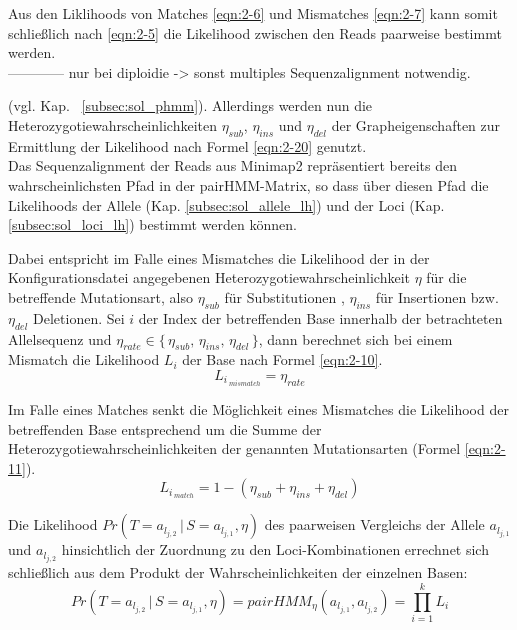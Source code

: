 Aus den Liklihoods von Matches \eqref{eqn:2-6} und Mismatches \eqref{eqn:2-7} kann somit schließlich nach \eqref{eqn:2-5} die Likelihood zwischen den Reads paarweise bestimmt werden.\\

------------
nur bei diploidie -> sonst multiples Sequenzalignment notwendig.

(vgl. Kap. ~\ref{subsec:sol_phmm}). Allerdings werden nun die Heterozygotiewahrscheinlichkeiten $\eta_{sub}$, $\eta_{ins}$ und $\eta_{del}$ der Grapheigenschaften zur Ermittlung der Likelihood nach Formel \eqref{eqn:2-20} genutzt.  \\

Das Sequenzalignment der Reads aus Minimap2 repräsentiert bereits den wahrscheinlichsten Pfad in der pairHMM-Matrix, so dass über diesen Pfad die Likelihoods der Allele (Kap. \ref{subsec:sol_allele_lh}) und der Loci (Kap. \ref{subsec:sol_loci_lh}) bestimmt werden können.

Dabei entspricht im Falle eines Mismatches die Likelihood der in der Konfigurationsdatei angegebenen Heterozygotiewahrscheinlichkeit $ \eta $ für die betreffende Mutationsart, also $ \eta_{sub} $ für Substitutionen , $ \eta_{ins} $ für Insertionen bzw. $ \eta_{del} $ Deletionen. Sei $i$ der Index der betreffenden Base innerhalb der betrachteten Allelsequenz und $ \eta_{rate} \in \{\,\eta_{sub},\, \eta_{ins},\, \eta_{del}\,\}$, dann berechnet sich bei einem Mismatch die Likelihood $L_{i}$ der Base nach Formel \eqref{eqn:2-10}.
\begin{equation} \label{eqn:2-10}
\tag{2-10}
L_{i\,_{mismatch}} = \eta_{rate}
\end{equation}

Im Falle eines Matches senkt die Möglichkeit eines Mismatches die Likelihood der betreffenden Base entsprechend um die Summe der Heterozygotiewahrscheinlichkeiten der genannten Mutationsarten (Formel \eqref{eqn:2-11}).
\begin{equation} \label{eqn:2-11}
\tag{2-11}
L_{i\,_{match}} = 1 - (\eta_{sub} + \eta_{ins} + \eta_{del})
\end{equation}

Die Likelihood $ Pr(T=a_{l_{j,2}} \, | \, S=a_{l_{j,1}}, \eta) $ des paarweisen Vergleichs der Allele $a_{l_{j,1}}$ und $a_{l_{j,2}}$ hinsichtlich der Zuordnung zu den Loci-Kombinationen errechnet sich schließlich aus dem Produkt der Wahrscheinlichkeiten der einzelnen Basen:
\begin{equation} \label{eqn:2-12}
\tag{2-12}
Pr(T=a_{l_{j,2}} \, | \, S=a_{l_{j,1}}, \eta) = pairHMM_{\eta}(a_{l_{j,1}}, a_{l_{j,2}}) = \prod_{i=1}^{k}L_{i}
\end{equation}

